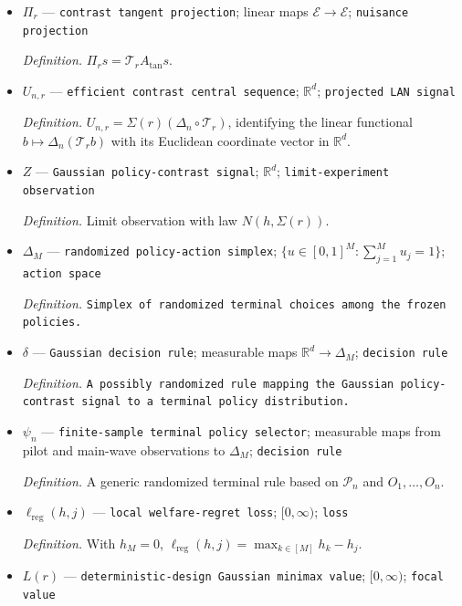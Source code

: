 \documentclass{article}
\begin{document}
\begin{itemize}
  \item \(\Pi_r\) --- \texttt{contrast tangent projection}; linear maps \(\mathcal E\to\mathcal E\); \texttt{nuisance projection}
  \par\smallskip\noindent\emph{Definition.} \(\Pi_rs=\mathcal T_rA_{\mathrm{tan}}s\).
  \item \(U_{n,r}\) --- \texttt{efficient contrast central sequence}; \(\mathbb R^d\); \texttt{projected LAN signal}
  \par\smallskip\noindent\emph{Definition.} \(U_{n,r}=\Sigma(r)(\Delta_n\circ\mathcal T_r)\), identifying the linear functional \(b\mapsto\Delta_n(\mathcal T_rb)\) with its Euclidean coordinate vector in \(\mathbb R^d\).
  \item \(Z\) --- \texttt{Gaussian policy-\allowbreak{}contrast signal}; \(\mathbb R^d\); \texttt{limit-\allowbreak{}experiment observation}
  \par\smallskip\noindent\emph{Definition.} Limit observation with law \(N(h,\Sigma(r))\).
  \item \(\Delta_M\) --- \texttt{randomized policy-\allowbreak{}action simplex}; \(\{u\in[0,1]^M:\sum_{j=1}^{M}u_j=1\}\); \texttt{action space}
  \par\smallskip\noindent\emph{Definition.} \texttt{Simplex of randomized terminal choices among the frozen policies.}
  \item \(\delta\) --- \texttt{Gaussian decision rule}; measurable maps \(\mathbb R^d\to\Delta_M\); \texttt{decision rule}
  \par\smallskip\noindent\emph{Definition.} \texttt{A possibly randomized rule mapping the Gaussian policy-\allowbreak{}contrast signal to a terminal policy distribution.}
  \item \(\psi_n\) --- \texttt{finite-\allowbreak{}sample terminal policy selector}; measurable maps from pilot and main-wave observations to \(\Delta_M\); \texttt{decision rule}
  \par\smallskip\noindent\emph{Definition.} A generic randomized terminal rule based on \(\mathscr P_n\) and \(O_1,\ldots,O_n\).
  \item \(\ell_{\mathrm{reg}}(h,j)\) --- \texttt{local welfare-\allowbreak{}regret loss}; \([0,\infty)\); \texttt{loss}
  \par\smallskip\noindent\emph{Definition.} With \(h_M=0\), \(\ell_{\mathrm{reg}}(h,j)=\max_{k\in[M]}h_k-h_j\).
  \item \(L(r)\) --- \texttt{deterministic-\allowbreak{}design Gaussian minimax value}; \([0,\infty)\); \texttt{focal value}

\end{itemize}
\end{document}
